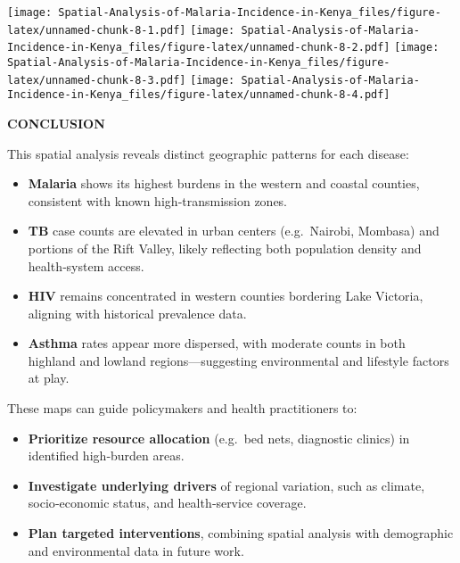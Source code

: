 \documentclass[
]{article}
\providecommand{\tightlist}{%
  \setlength{\itemsep}{0pt}\setlength{\parskip}{0pt}}
\begin{document}
\texttt{[image: Spatial-Analysis-of-Malaria-Incidence-in-Kenya\_files/figure-latex/unnamed-chunk-8-1.pdf]}
\texttt{[image: Spatial-Analysis-of-Malaria-Incidence-in-Kenya\_files/figure-latex/unnamed-chunk-8-2.pdf]}
\texttt{[image: Spatial-Analysis-of-Malaria-Incidence-in-Kenya\_files/figure-latex/unnamed-chunk-8-3.pdf]}
\texttt{[image: Spatial-Analysis-of-Malaria-Incidence-in-Kenya\_files/figure-latex/unnamed-chunk-8-4.pdf]}

\textbf{CONCLUSION}

This spatial analysis reveals distinct geographic patterns for each
disease:

\begin{itemize}
\tightlist
\item
  \textbf{Malaria} shows its highest burdens in the western and coastal
  counties, consistent with known high‑transmission zones.\\
\item
  \textbf{TB} case counts are elevated in urban centers (e.g.~Nairobi,
  Mombasa) and portions of the Rift Valley, likely reflecting both
  population density and health‑system access.\\
\item
  \textbf{HIV} remains concentrated in western counties bordering Lake
  Victoria, aligning with historical prevalence data.\\
\item
  \textbf{Asthma} rates appear more dispersed, with moderate counts in
  both highland and lowland regions---suggesting environmental and
  lifestyle factors at play.
\end{itemize}

These maps can guide policymakers and health practitioners to:

\begin{itemize}
\tightlist
\item
  \textbf{Prioritize resource allocation} (e.g.~bed nets, diagnostic
  clinics) in identified high‑burden areas.\\
\item
  \textbf{Investigate underlying drivers} of regional variation, such as
  climate, socio‑economic status, and health‑service coverage.\\
\item
  \textbf{Plan targeted interventions}, combining spatial analysis with
  demographic and environmental data in future work.
\end{itemize}
\end{document}
